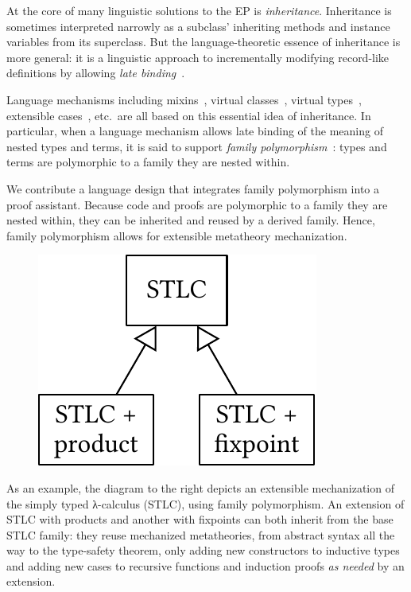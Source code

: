 At the core of many linguistic solutions to the EP is \emph{inheritance}.
Inheritance is sometimes interpreted narrowly as a subclass'
inheriting methods and instance variables from its superclass.
But the language-theoretic essence of inheritance is more general:
it is a linguistic approach to incrementally modifying
record-like definitions by allowing \emph{late binding}~\cite{cook1990inheritance}.

Language mechanisms including
mixins~\cite{mixin-1990},
virtual classes~\cite{virtualclasses-1989,vc-calculus-2006},
virtual types~\cite{thorup97}, %
extensible cases~\cite{bac2006}, etc.\ 
are all based on this essential idea of inheritance.
%
In particular, when a language mechanism allows late binding of the
meaning of nested types and terms,
it is said to support \emph{family polymorphism}~\cite{ernst2001family}:
types and terms are polymorphic to a family they are nested within.


We contribute a language design that integrates family polymorphism into
a proof assistant.
Because code and proofs are polymorphic to a family they are nested
within, they can be
inherited and reused by a derived family.
Hence, family polymorphism allows for extensible metatheory mechanization.

\begingroup

\begin{figure}
\includegraphics[scale=.48]{graphics/stlc-intro.pdf}
\end{figure}

As an example, the diagram to the right depicts an extensible
mechanization of the simply typed λ-calculus (STLC), using family
polymorphism.
An extension of STLC with products and another with fixpoints
can both inherit from the base STLC family:
they reuse mechanized metatheories,
from abstract syntax all the way to the type-safety theorem,
only adding new constructors to inductive types
and adding new cases to recursive functions and induction proofs
\emph{as needed} by an extension.

